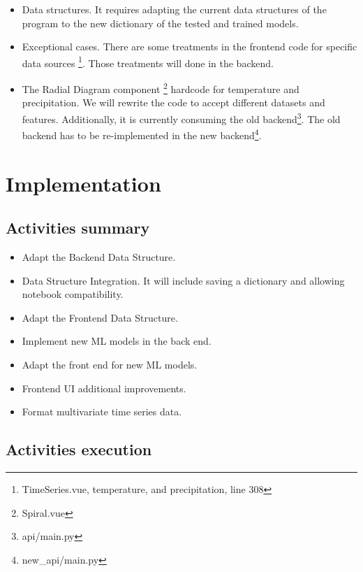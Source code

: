 \documentclass[a4paper]{article}
\begin{document}
\begin{itemize}
\item Data structures. It requires adapting the current data structures of the program to the new dictionary of the tested and trained models.

\item Exceptional cases. There are some treatments in the frontend code for specific data sources \footnote{TimeSeries.vue, temperature, and precipitation, line 308}. Those treatments will done in the backend.

\item The Radial Diagram component \footnote{Spiral.vue} hardcode for temperature and precipitation. We will rewrite the code to accept different datasets and features. Additionally, it is currently consuming the old backend\footnote{api/main.py}. The old backend has to be re-implemented in the new backend\footnote{new\_api/main.py}.
\end{itemize}

\section{Implementation}
\label{sec:org13a3e7c}

\subsection{Activities summary}
\label{sec:orgc1d58ce}

\begin{itemize}
\item Adapt the Backend Data Structure.

\item Data Structure Integration. It will include saving a dictionary and allowing notebook compatibility.

\item Adapt the Frontend Data Structure.

\item Implement new ML models in the back end.

\item Adapt the front end for new ML models.

\item Frontend UI additional improvements.

\item Format multivariate time series data.
\end{itemize}


\subsection{Activities execution}
\label{sec:org115b6c7}
\end{document}
